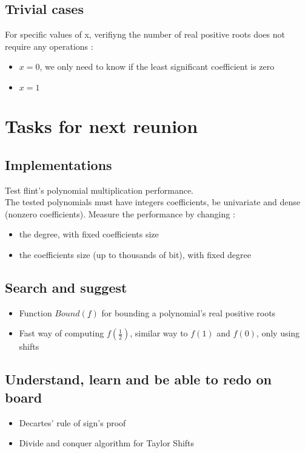 \documentclass[a4paper,12pt]{article}
\begin{document}
\subsection*{Trivial cases}
For specific values of x, verifiyng the number of real positive roots does not require any operations :
\begin{itemize}
  \item \(x = 0\), we only need to know if the least significant coefficient is zero
  \item \(x= 1\)
\end{itemize}

\section{Tasks for next reunion}

\subsection*{Implementations}
Test flint's polynomial multiplication performance.\\
The tested polynomials must have integers coefficients, be univariate and dense (nonzero coefficients).
Measure the performance by changing :
\begin{itemize}
    \item the degree, with fixed coefficients size
    \item the coefficients size (up to thousands of bit), with fixed degree
\end{itemize}

\subsection*{Search and suggest}
\begin{itemize}
  \item Function \(Bound(\underline{f})\) for bounding a polynomial's real positive roots
  \item Fast way of computing \(f(\frac{1}{2})\), similar way to \(f(1)\) and \(f(0)\), only using shifts
\end{itemize}

\subsection*{Understand, learn and be able to redo on board}
\begin{itemize}
    \item Decartes' rule of sign's proof
    \item Divide and conquer algorithm for Taylor Shifts
\end{itemize}
\end{document}
